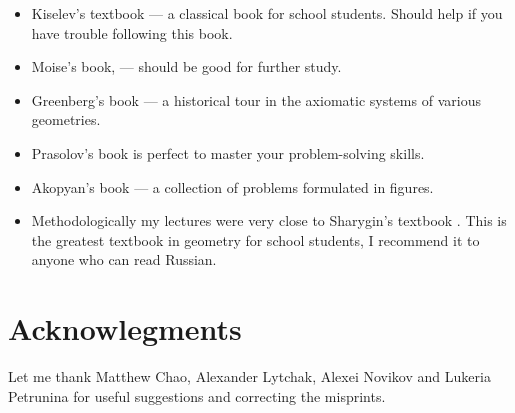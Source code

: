 \begin{itemize}
\item Kiselev's textbook \cite{kiselev} ---
a classical book for school students.
Should help if you have trouble following this book.

\item Moise's book, \cite{moise} ---
should be good for further study.

\item Greenberg's book \cite{greenberg}  --- a historical tour in the axiomatic systems of various geometries.

\item Prasolov's book \cite{prasolov} is perfect to master your problem-solving skills.

\item Akopyan's book \cite{akopyan} --- a collection of problems formulated in figures.

\item Methodologically my lectures
were very close to Sharygin's  textbook \cite{sharygin}.
This is the greatest textbook in geometry for school students,
I recommend it to anyone who can read Russian.


\end{itemize}

\section*{Acknowlegments}

Let me thank  
Matthew Chao, 
Alexander Lytchak,
Alexei Novi\-kov
and Lukeria Petrunina
for useful suggestions and correcting the misprints.






